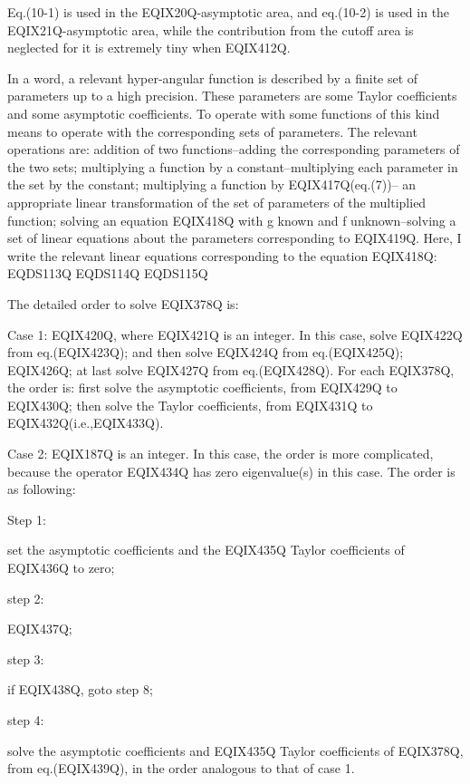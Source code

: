 Eq.(10-1) is used in the EQIX20Q-asymptotic area, and eq.(10-2) is used in the
EQIX21Q-asymptotic area, while the contribution from the cutoff area is neglected for
it is extremely tiny when EQIX412Q.

In a word, a relevant hyper-angular function is described by a finite set of
parameters up to a high precision. These parameters are some Taylor
coefficients and some asymptotic coefficients.
To operate with some functions of this kind means
to operate with the corresponding sets of parameters. The relevant operations
are: addition of two functions--adding the corresponding parameters of the
two sets; multiplying a function by a constant--multiplying each parameter in the
set by the constant; multiplying a function by EQIX417Q(eq.(7))--
an appropriate linear transformation of the set of parameters of the multiplied
function; solving an equation EQIX418Q with g known and f unknown--solving
a set of linear equations about the parameters corresponding to EQIX419Q. Here, I write
the relevant linear equations corresponding to the equation EQIX418Q:
 EQDS113Q 
 EQDS114Q 
 EQDS115Q 

The detailed order to solve EQIX378Q is:

Case 1: EQIX420Q, where EQIX421Q is an integer. In this case,
solve EQIX422Q from eq.(EQIX423Q);
and then solve EQIX424Q from eq.(EQIX425Q);
EQIX426Q; at last solve EQIX427Q from eq.(EQIX428Q). For each
EQIX378Q, the order is: first solve the asymptotic coefficients,
from EQIX429Q to EQIX430Q; then solve the
Taylor coefficients, from EQIX431Q to EQIX432Q(i.e.,EQIX433Q).

Case 2: EQIX187Q is an integer. In this case, the order is more complicated,
because the operator EQIX434Q has zero eigenvalue(s) in this case. The order
is as following:

\vspace{0.5mm}
\noindent Step 1: \parbox[t]{146mm}
{set the asymptotic coefficients and the EQIX435Q Taylor coefficients
of EQIX436Q to zero;}

\vspace{1.5mm}
\noindent step 2: \parbox[t]{146mm}
{EQIX437Q;}

\vspace{1.5mm}
\noindent step 3: \parbox[t]{146mm}
{if EQIX438Q, goto step 8;}

\vspace{1.5mm}
\noindent step 4: \parbox[t]{146mm}
{solve the asymptotic coefficients and EQIX435Q Taylor coefficients of
EQIX378Q, from eq.(EQIX439Q), in the order analogous to that of case 1.}

